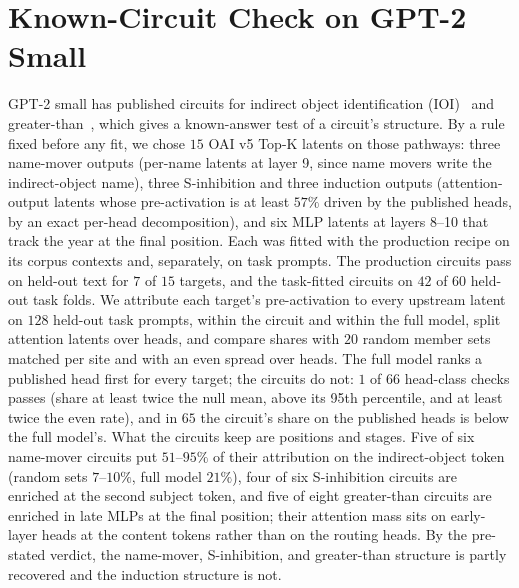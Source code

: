 \documentclass[10pt]{article}
\begin{document}
\section{Known-Circuit Check on GPT-2 Small}
\label{app:known-circuits}
GPT-2 small has published circuits for indirect object identification (IOI)~\citep{wang2023interpretability} and greater-than~\citep{hanna2023how}, which gives a known-answer test of a circuit's structure.
By a rule fixed before any fit, we chose $15$ OAI v5 Top-K latents on those pathways: three name-mover outputs (per-name latents at layer 9, since name movers write the indirect-object name), three S-inhibition and three induction outputs (attention-output latents whose pre-activation is at least $57\%$ driven by the published heads, by an exact per-head decomposition), and six MLP latents at layers 8--10 that track the year at the final position.
Each was fitted with the production recipe on its corpus contexts and, separately, on task prompts.
The production circuits pass on held-out text for $7$ of $15$ targets, and the task-fitted circuits on $42$ of $60$ held-out task folds.
We attribute each target's pre-activation to every upstream latent on $128$ held-out task prompts, within the circuit and within the full model, split attention latents over heads, and compare shares with $20$ random member sets matched per site and with an even spread over heads.
The full model ranks a published head first for every target; the circuits do not: $1$ of $66$ head-class checks passes (share at least twice the null mean, above its 95th percentile, and at least twice the even rate), and in $65$ the circuit's share on the published heads is below the full model's.
What the circuits keep are positions and stages.
Five of six name-mover circuits put $51$--$95\%$ of their attribution on the indirect-object token (random sets $7$--$10\%$, full model $21\%$), four of six S-inhibition circuits are enriched at the second subject token, and five of eight greater-than circuits are enriched in late MLPs at the final position; their attention mass sits on early-layer heads at the content tokens rather than on the routing heads.
By the pre-stated verdict, the name-mover, S-inhibition, and greater-than structure is partly recovered and the induction structure is not.
\end{document}
